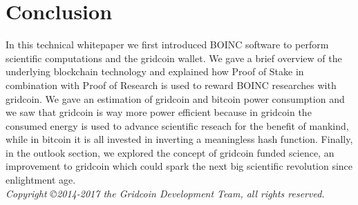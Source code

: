 \section{Conclusion}

In this technical whitepaper we first introduced BOINC software to perform scientific computations and the gridcoin wallet. We gave a brief overview of the underlying blockchain technology and explained how Proof of Stake in combination with Proof of Research is used to reward BOINC researches with gridcoin. We gave an estimation of gridcoin and bitcoin power consumption and we saw that gridcoin is way more power efficient because in gridcoin the consumed energy is used to advance scientific reseach for the benefit of mankind, while in bitcoin it is all invested in inverting a meaningless hash function. Finally, in the outlook section, we explored the concept of gridcoin funded science, an improvement to gridcoin which could spark the next big scientific revolution since enlightment age.\\

\textit{Copyright \copyright  2014-2017 the Gridcoin Development Team, all rights reserved.}
